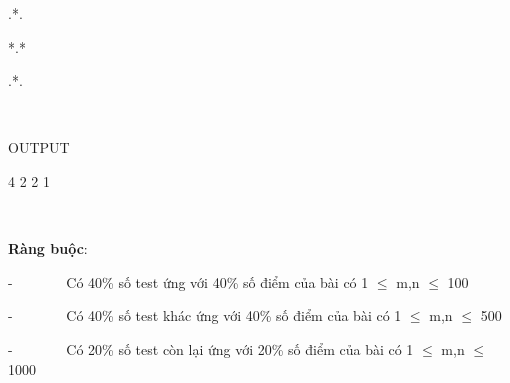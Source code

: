 .*.

*.*

.*.

 

OUTPUT

4 2 2 1

 

\textbf{Ràng buộc}:

-        Có 40\% số test ứng với 40\% số điểm của bài có 1  $\le$  m,n  $\le$  100

-        Có 40\% số test khác ứng với 40\% số điểm của bài có 1  $\le$  m,n  $\le$  500

-        Có 20\% số test còn lại ứng với 20\% số điểm của bài có 1  $\le$  m,n  $\le$  1000

 
